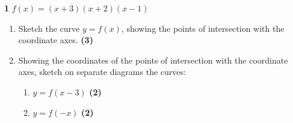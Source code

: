 \documentclass[a4paper,12pt]{article}
\begin{document}
\begin{tcolorbox}
\textbf{1} \hspace{1em} %
\textbf{$f(x) = (x + 3)(x + 2)(x - 1)$} 

\begin{enumerate}[label=(\alph*)] 
\item Sketch the curve \( y = f(x) \), showing the points of intersection with the coordinate axes. \hfill \textbf{(3)} 
\vfill %

\item Showing the coordinates of the points of intersection with the coordinate axes, sketch on separate diagrams the curves:
    \begin{enumerate}[label=(\roman*)]
    \item \( y = f(x - 3) \) \hfill \textbf{(2)} 
    \vfill 
    \item \( y = f(-x) \) \hfill \textbf{(2)} 
    \vfill
    \end{enumerate}
\end{enumerate}

\end{tcolorbox} %
\end{document}
